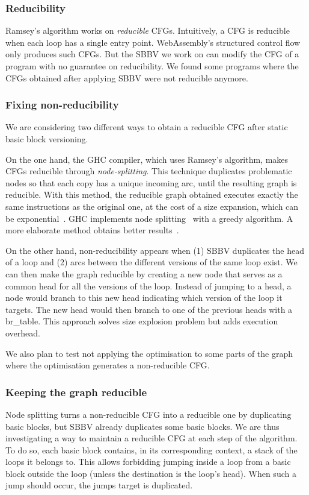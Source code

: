 \documentclass[a4paper,11pt]{article}
\begin{document}
\subsubsection{Reducibility}
Ramsey's algorithm works on \emph{reducible} CFGs. Intuitively, a CFG is
reducible when each loop has a single entry point. WebAssembly's structured
control flow only produces such CFGs. But the SBBV we work on can modify the CFG
of a program with no guarantee on reducibility. We found some programs where the
CFGs obtained after applying SBBV were not reducible anymore.

\subsubsection{Fixing non-reducibility}
We are considering two different ways to obtain a reducible CFG after static
basic block versioning.

On the one hand, the GHC compiler, which uses Ramsey's algorithm, makes CFGs
reducible through \emph{node-splitting}. This technique duplicates problematic
nodes so that each copy has a unique incoming arc, until the resulting graph
is reducible. With this method, the reducible graph obtained executes exactly
the same instructions as the original one, at the cost of a size expansion,
which can be exponential~\cite{carter2003folklore}. GHC implements node
splitting~\cite[Appendix~A]{ramsey2022beyond} with a greedy algorithm. A more
elaborate method obtains better results~\cite{janssen1997making}.

On the other hand, non-reducibility appears when (1) SBBV duplicates the head of
a loop and (2) arcs between the different versions of the same loop exist. We
can then make the graph reducible by creating a new node that serves as a common
head for all the versions of the loop. Instead of jumping to a head, a node
would branch to this new head indicating which version of the loop it targets.
The new head would then branch to one of the previous heads with a
\textsf{br\_table}. This approach solves size explosion problem but adds
execution overhead.

We also plan to test not applying the optimisation to some parts of the graph
where the optimisation generates a non-reducible CFG\@.

\subsubsection{Keeping the graph reducible}
Node splitting turns a non-reducible CFG into a reducible one by duplicating
basic blocks, but SBBV already duplicates some basic blocks. We are thus
investigating a way to maintain a reducible CFG at each step of the algorithm.
To do so, each basic block contains, in its corresponding context, a stack of
the loops it belongs to. This allows forbidding jumping inside a loop from a
basic block outside the loop (unless the destination is the loop's head). When
such a jump should occur, the jumps target is duplicated.
\end{document}
